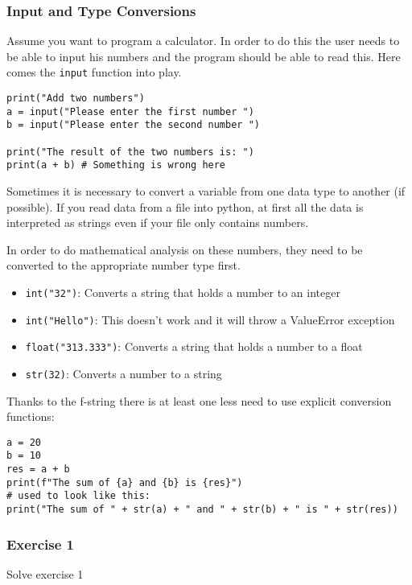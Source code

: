 \documentclass[10pt, a4paper]{beamer} %
\begin{document}
\begin{frame}
	\frametitle{Input and Type Conversions}

	Assume you want to program a calculator.
	In order to do this the user needs to be able to input his numbers and the program should be able to read this.
	Here comes the \lstinline!input! function into play.

	\begin{lstlisting}
print("Add two numbers")
a = input("Please enter the first number ")
b = input("Please enter the second number ")

print("The result of the two numbers is: ")
print(a + b) # Something is wrong here
\end{lstlisting}


	\framebreak
	Sometimes it is necessary to convert a variable from one data type to another (if possible). If you
	read data from a file into python, at first all the data is interpreted as strings even if your file only
	contains numbers.

	In order to do mathematical analysis on these numbers, they need to be converted to the appropriate number type first.

	\begin{itemize}
		\item \lstinline!int("32")!: Converts a string that holds a number to an integer
		\item \lstinline!int("Hello")!: This doesn't work and it will throw a ValueError exception
		\item \lstinline!float("313.333")!: Converts a string that holds a number to a float
		\item \lstinline!str(32)!: Converts a number to a string
	\end{itemize}

	Thanks to the f-string there is at least one less need to use explicit conversion functions:
	\begin{examples}
		\begin{lstlisting}
a = 20
b = 10
res = a + b
print(f"The sum of {a} and {b} is {res}")
# used to look like this:
print("The sum of " + str(a) + " and " + str(b) + " is " + str(res))
\end{lstlisting}
	\end{examples}
\end{frame}

{
\bfseries
\begin{frame}[c]\frametitle{Exercise 1}
	Solve exercise 1
\end{frame}
}
\end{document}
